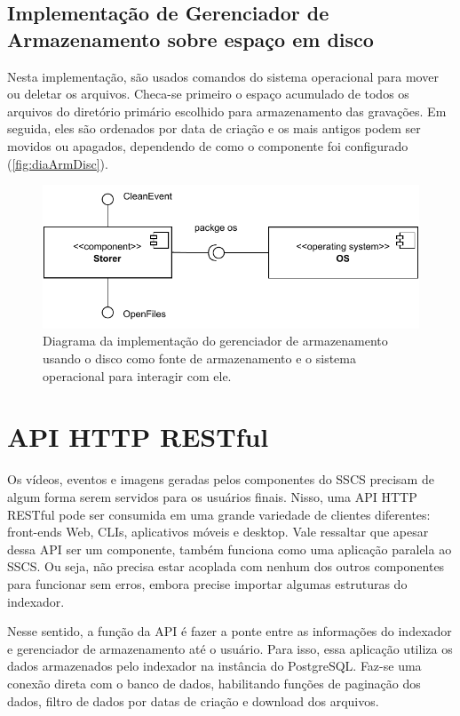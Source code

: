 \documentclass[12pt, %
openright, 
oneside, %
a4paper,    %
brazil]{facom-ufu-abntex2}
\begin{document}
\subsection{Implementação de Gerenciador de Armazenamento sobre espaço em
	disco}

Nesta implementação, são usados comandos do sistema operacional para mover ou
deletar os arquivos. Checa-se primeiro o espaço acumulado de todos os arquivos
do diretório primário escolhido para armazenamento das gravações. Em seguida,
eles são ordenados por data de criação e os mais antigos podem ser movidos ou
apagados, dependendo de como o componente foi configurado
(\autoref{fig:diaArmDisc}).

\begin{figure}[!ht]
	\centering
	\includegraphics[width=0.8\linewidth]{storer_os.pdf}
	\caption[Diagrama da implementação do gerenciador de armazenamento
		usando o sistema operacional]{Diagrama da implementação do gerenciador de
		armazenamento usando o disco como fonte de armazenamento e o sistema
		operacional para interagir com ele.}
	\label{fig:diaArmDisc}
\end{figure}

\section{API HTTP RESTful}

Os vídeos, eventos e imagens geradas pelos componentes do SSCS precisam de
algum forma serem servidos para os usuários finais. Nisso, uma API HTTP RESTful
pode ser consumida em uma grande variedade de clientes diferentes: front-ends
Web, CLIs, aplicativos móveis e desktop. Vale ressaltar que apesar dessa API
ser um componente, também funciona como uma aplicação paralela ao SSCS. Ou
seja, não precisa estar acoplada com nenhum dos outros componentes para
funcionar sem erros, embora precise importar algumas estruturas do indexador.

Nesse sentido, a função da API é fazer a ponte entre as informações do
indexador e gerenciador  de armazenamento até o usuário. Para isso, essa
aplicação utiliza os dados armazenados pelo indexador na instância do
PostgreSQL. Faz-se uma conexão direta com o banco de dados, habilitando funções
de paginação dos dados, filtro de dados por datas de criação e download dos
arquivos.
\end{document}
